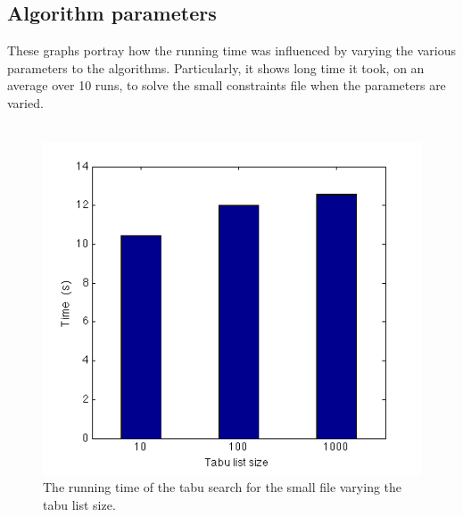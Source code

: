 \documentclass[titlepage,a4paper]{article}
\begin{document}
\subsection{Algorithm parameters}
These graphs portray how the running time was influenced by varying the various parameters to the algorithms. Particularly, it shows long time it took, on an average over 10 runs, to solve the small constraints file when the parameters are varied. \\\\
\begin{figure}[H]
  \begin{center}
    \includegraphics[scale=0.5]{../results/tabu_list_size.png}
  \end{center}
  \caption{The running time of the tabu search for the small file varying the tabu list size.}
  \label{tabu_list_size}
\end{figure}
\end{document}
